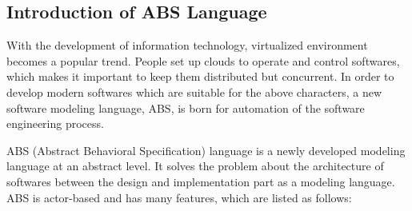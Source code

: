 \documentclass[article,dr=phil,type=drfinal,colorback,accentcolor=tud9c]{tudthesis}
\begin{document}
  \subsection{Introduction of ABS Language}
  
  With the development of information technology, virtualized environment becomes a popular trend. People set up clouds to operate and control softwares, which makes it important to keep them distributed but concurrent. In order to develop modern softwares which are suitable for the above characters, a new software modeling language, ABS, is born for automation of the software engineering process.
  
  ABS (Abstract Behavioral Specification) language is a newly developed modeling language at an abstract level. It solves the problem about the architecture of softwares between the design and implementation part as a modeling language. ABS is actor-based and has many features, which are listed as follows:
  
\end{document}
